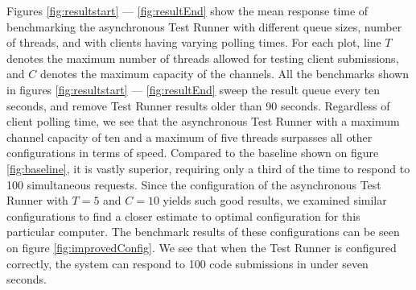 Figures \ref{fig:resultstart} --- \ref{fig:resultEnd} show the mean response time of benchmarking the asynchronous Test Runner with different queue sizes, number of threads, and with clients having varying polling times.
For each plot, line $T$ denotes the maximum number of threads allowed for testing client submissions, and $C$ denotes the maximum capacity of the channels.
All the benchmarks shown in figures \ref{fig:resultstart} --- \ref{fig:resultEnd} sweep the result queue every ten seconds, and remove Test Runner results older than 90 seconds.
Regardless of client polling time, we see that the asynchronous Test Runner with a maximum channel capacity of ten and a maximum of five threads surpasses all other configurations in terms of speed.
Compared to the baseline shown on figure \ref{fig:baseline}, it is vastly superior, requiring only a third of the time to respond to 100 simultaneous requests.
Since the configuration of the asynchronous Test Runner with $T = 5$ and $C = 10$ yields such good results, we examined similar configurations to find a closer estimate to optimal configuration for this particular computer.
The benchmark results of these configurations can be seen on figure \ref{fig:improvedConfig}.
We see that when the Test Runner is configured correctly, the system can respond to 100 code submissions in under seven seconds.

